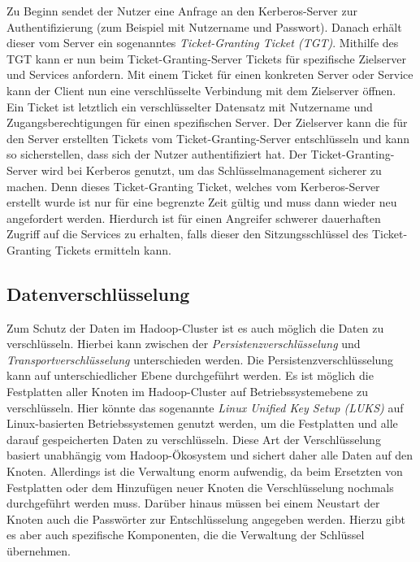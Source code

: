 \noindent
Zu Beginn sendet der Nutzer eine Anfrage an den Kerberos-Server zur Authentifizierung (zum Beispiel mit Nutzername und Passwort). Danach erhält dieser vom Server ein sogenanntes \textit{Ticket-Granting Ticket (TGT)}. Mithilfe des TGT kann er nun beim Ticket-Granting-Server Tickets für spezifische Zielserver und Services anfordern. Mit einem Ticket für einen konkreten Server oder Service kann der Client nun eine verschlüsselte Verbindung mit dem Zielserver öffnen.\\
Ein Ticket ist letztlich ein verschlüsselter Datensatz mit Nutzername und Zugangsberechtigungen für einen spezifischen Server. Der Zielserver kann die für den Server erstellten Tickets vom Ticket-Granting-Server entschlüsseln und kann so sicherstellen, dass sich der Nutzer authentifiziert hat. Der Ticket-Granting-Server wird bei Kerberos genutzt, um das Schlüsselmanagement sicherer zu machen. Denn dieses Ticket-Granting Ticket, welches vom Kerberos-Server erstellt wurde ist nur für eine begrenzte Zeit gültig und muss dann wieder neu angefordert werden. Hierdurch ist für einen Angreifer schwerer dauerhaften Zugriff auf die Services zu erhalten, falls dieser den Sitzungsschlüssel des Ticket-Granting Tickets ermitteln kann.\cite[S. 425-429]{crypto}\\


\subsection{Datenverschlüsselung}
Zum Schutz der Daten im Hadoop-Cluster ist es auch möglich die Daten zu verschlüsseln. Hierbei kann zwischen der \textit{Persistenzverschlüsselung} und \textit{Transportverschlüsselung} unterschieden werden. Die Persistenzverschlüsselung kann auf unterschiedlicher Ebene durchgeführt werden. Es ist möglich die Festplatten aller Knoten im Hadoop-Cluster auf Betriebssystemebene zu verschlüsseln. Hier könnte das sogenannte \textit{Linux Unified Key Setup (LUKS)} auf Linux-basierten Betriebssystemen genutzt werden, um die Festplatten und alle darauf gespeicherten Daten zu verschlüsseln. Diese Art der Verschlüsselung basiert unabhängig vom Hadoop-Ökosystem und sichert daher alle Daten auf den Knoten. Allerdings ist die Verwaltung enorm aufwendig, da beim Ersetzten von Festplatten oder dem Hinzufügen neuer Knoten die Verschlüsselung nochmals durchgeführt werden muss. Darüber hinaus müssen bei einem Neustart der Knoten auch die Passwörter zur Entschlüsselung angegeben werden. Hierzu gibt es aber auch spezifische Komponenten, die die Verwaltung der Schlüssel übernehmen. \cite[S. 202-204]{hadoop_security}\\

